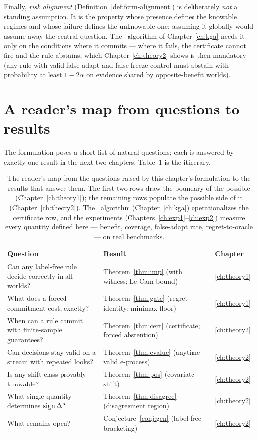 Finally, \emph{risk alignment} (Definition~\ref{def:form-alignment}) is
deliberately \emph{not} a standing assumption. It is the property whose
presence defines the knowable regimes and whose failure defines the
unknowable one; assuming it globally would assume away the central question.
The \KGA\ algorithm of Chapter~\ref{ch:kga} needs it only on the conditions
where it commits --- where it fails, the certificate cannot fire and the
rule abstains, which Chapter~\ref{ch:theory2} shows is then mandatory (any
rule with valid false-adapt and false-freeze control must abstain with
probability at least $1-2\alpha$ on evidence shared by opposite-benefit
worlds).

\section{A reader's map from questions to results}\label{sec:form-map}

The formulation poses a short list of natural questions; each is answered by
exactly one result in the next two chapters.
Table~\ref{tab:form-map} is the itinerary.

\begin{table}[t]\centering\small
\begin{tabular}{p{}ll}
\toprule
Question & Result & Chapter\\
\midrule
Can any label-free rule decide correctly in all worlds? &
Theorem~\ref{thm:imp} (with witness; Le Cam bound) & \ref{ch:theory1}\\
What does a forced commitment cost, exactly? &
Theorem~\ref{thm:gate} (regret identity; minimax floor) & \ref{ch:theory1}\\
When can a rule commit with finite-sample guarantees? &
Theorem~\ref{thm:cert} (certificate; forced abstention) & \ref{ch:theory2}\\
Can decisions stay valid on a stream with repeated looks? &
Theorem~\ref{thm:evalue} (anytime-valid e-process) & \ref{ch:theory2}\\
Is any shift class provably knowable? &
Theorem~\ref{thm:pos} (covariate shift) & \ref{ch:theory2}\\
What single quantity determines $\operatorname{sign}\Delta$? &
Theorem~\ref{thm:disagree} (disagreement region) & \ref{ch:theory2}\\
What remains open? &
Conjecture~\ref{conj:gen} (label-free bracketing) & \ref{ch:theory2}\\
\bottomrule
\end{tabular}
\caption[Map from formulation questions to results]{The reader's map from
the questions raised by this chapter's formulation to the results that
answer them. The first two rows draw the boundary of the possible
(Chapter~\ref{ch:theory1}); the remaining rows populate the possible side of
it (Chapter~\ref{ch:theory2}). The \KGA\ algorithm (Chapter~\ref{ch:kga})
operationalizes the certificate row, and the experiments
(Chapters~\ref{ch:exp1}--\ref{ch:exp2}) measure every quantity defined here
--- benefit, coverage, false-adapt rate, regret-to-oracle --- on real
benchmarks.}
\label{tab:form-map}
\end{table}

